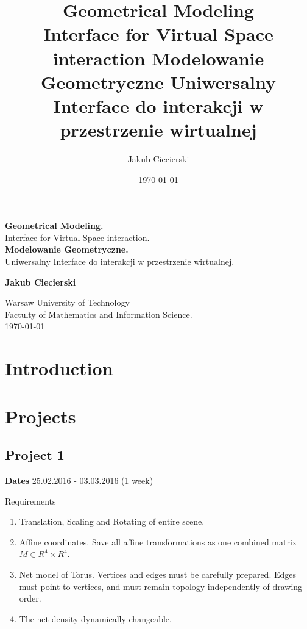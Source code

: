 \documentclass{book}
\title{
    {\bf Geometrical Modeling} \\ Interface for Virtual Space interaction    \vspace{50pt} {\bf Modelowanie Geometryczne} Uniwersalny Interface do interakcji w przestrzenie wirtualnej
}
\author{Jakub Ciecierski}
\date{\today}
\begin{document}
\begin{titlepage}
    \begin{center}

            \textbf{\huge  Geometrical Modeling.} \\ {\huge Interface for Virtual Space interaction.} \\ [0.5cm]
            
            \textbf{\huge  Modelowanie Geometryczne.} \\ {\huge Uniwersalny Interface do interakcji w przestrzenie wirtualnej.} \\ [0.5cm]
            
            \vspace*{\fill}

            \textbf{\large Jakub Ciecierski}

            \vspace*{\fill}
            
            \textnormal{\large Warsaw University of Technology \\ Factulty of Mathematics and Information Science. \\ \today}

    \end{center}
\end{titlepage}

\tableofcontents









\chapter*{Introduction}

\chapter{Projects}

\section{Project 1}
{\bf Dates} 25.02.2016 - 03.03.2016 (1 week)

Requirements
\begin{enumerate}
    \item Translation, Scaling and Rotating of entire scene.
    \item Affine coordinates. Save all affine transformations as one combined matrix $M \in R^4 \times R^4$.
    \item Net model of Torus. Vertices and edges must be carefully prepared. Edges must point to vertices, and must remain topology independently of drawing order.
    \item The net density dynamically changeable.
\end{enumerate}

\begin{thebibliography}{1}
    
    
\end{thebibliography}
\end{document}
